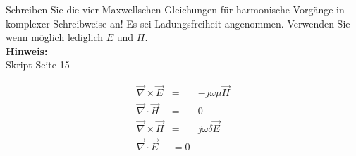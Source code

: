 \begin{question}[section=2,name={Maxwell harmonisch},difficulty=,quantity=3,type=thr,tags={20131024,20061016}]
	Schreiben Sie die vier Maxwellschen Gleichungen für harmonische Vorgänge in komplexer Schreibweise an! Es sei Ladungsfreiheit angenommen. Verwenden Sie wenn möglich lediglich $E$ und $H$.
	\\ \textbf{Hinweis:}\\
	Skript Seite 15
\end{question}
\begin{solution}
	\begin{eqnarray}
		\vec{\nabla} \times \vec{E} &=& -j \omega \mu \vec{H}\\
		\vec{\nabla} \cdot \vec{H} &=& 0\\
  \vec{\nabla} \times \vec{H} &=& j \omega \delta \vec{E}\\
\vec{\nabla} \cdot \vec{E} &= 0
  \end{eqnarray}
\end{solution}
